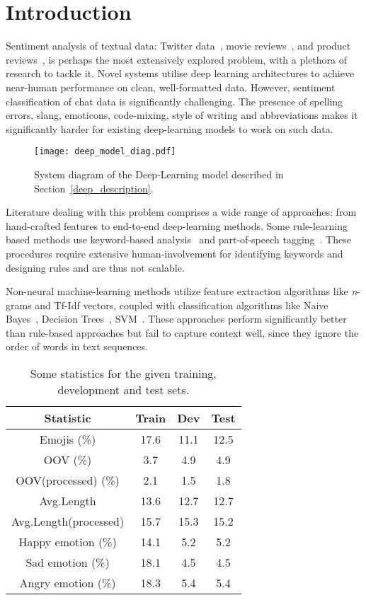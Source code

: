 \documentclass[11pt,a4paper]{article}
\begin{document}
\section{Introduction}
Sentiment analysis of textual data: Twitter data~\cite{kouloumpis2011twitter, pak2010twitter}, movie reviews~\cite{thet2010aspect}, and product reviews~\cite{pang2008opinion}, is perhaps the most extensively explored problem, with a plethora of research to tackle it. Novel systems utilise deep learning architectures to achieve near-human performance on clean, well-formatted data. However, sentiment classification of chat data is significantly challenging. The presence of spelling errors, slang, emoticons, code-mixing, style of writing and abbreviations makes it significantly harder for existing deep-learning models to work on such data. \par
\begin{figure*}[t]
\begin{center}
    \texttt{[image: deep\_model\_diag.pdf]}
\end{center}
  \caption{System diagram of the Deep-Learning model described in Section~\ref{deep_description}.}
\label{fig:deep_architecture}
\end{figure*}
Literature dealing with this problem comprises a wide range of approaches: from hand-crafted features to end-to-end deep-learning methods. Some rule-learning based methods use keyword-based analysis~\cite{ko2000automatic} and part-of-speech tagging~\cite{agarwal2011sentiment}. These procedures require extensive human-involvement for identifying keywords and designing rules and are thus not scalable. \par
Non-neural machine-learning methods utilize feature extraction algorithms like \textit{n}-grams and Tf-Idf vectors, coupled with classification algorithms like Naive Bayes~\cite{pang2002thumbs}, Decision Trees~\cite{bilal2016sentiment}, SVM~\cite{moraes2013document}. These approaches perform significantly better than rule-based approaches but fail to capture context well, since they ignore the order of words in text sequences. \par
\begin{table}[h!]
\centering
 \begin{tabular}{||c c c c||} 
 \hline
 \textbf{Statistic} & \textbf{Train} & \textbf{Dev} & \textbf{Test} \\
 \hline\hline
 Emojis (\%) & 17.6 & 11.1 & 12.5 \\ 
 \hline
 OOV (\%) & 3.7 & 4.9 & 4.9 \\
 OOV(processed) (\%) & 2.1 & 1.5 & 1.8 \\
 \hline
 Avg.Length & 13.6 & 12.7 & 12.7 \\
 Avg.Length(processed) & 15.7 & 15.3 & 15.2 \\
 \hline
 Happy emotion (\%) & 14.1 & 5.2 & 5.2 \\
 Sad emotion (\%) & 18.1 & 4.5 & 4.5 \\ 
 Angry emotion (\%) & 18.3 & 5.4 & 5.4 \\ 
 \hline
 \end{tabular}
 \caption{Some statistics for the given training, development and test sets.}
 \label{table:data_stats}
\end{table}
\end{document}
